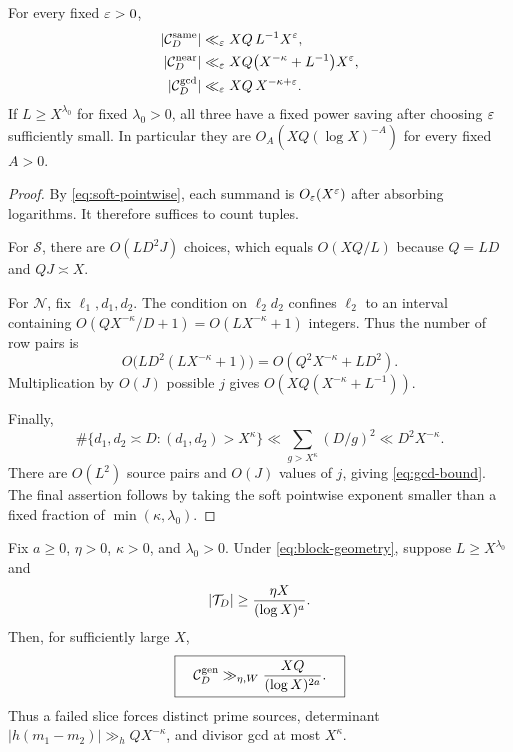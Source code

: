 \begin{theorem}
\label{thm:degenerate-removal}
For every fixed $\varepsilon>0$,
\begin{align}
 |\mathcal C_D^{\mathrm{same}}|
 &\ll_\varepsilon XQ\,L^{-1}X^\varepsilon,
 \label{eq:same-bound}\\
 |\mathcal C_D^{\mathrm{near}}|
 &\ll_\varepsilon XQ\bigl(X^{-\kappa}+L^{-1}\bigr)X^\varepsilon,
 \label{eq:near-bound}\\
 |\mathcal C_D^{\mathrm{gcd}}|
 &\ll_\varepsilon XQ\,X^{-\kappa+\varepsilon}.
 \label{eq:gcd-bound}
\end{align}
If $L\ge X^{\lambda_0}$ for fixed $\lambda_0>0$, all three have a
fixed power saving after choosing $\varepsilon$ sufficiently small.  In
particular they are $O_A(XQ(\log X)^{-A})$ for every fixed $A>0$.
\end{theorem}

\begin{proof}
By \eqref{eq:soft-pointwise}, each summand is $O_\varepsilon(X^\varepsilon)$ after
absorbing logarithms.  It therefore suffices to count tuples.

For $\mathscr S$, there are $O(LD^2J)$ choices, which equals
$O(XQ/L)$ because $Q=LD$ and $QJ\asymp X$.

For $\mathscr N$, fix $\ell_1,d_1,d_2$.  The condition on
$\ell_2d_2$ confines $\ell_2$ to an interval containing
$O(QX^{-\kappa}/D+1)=O(LX^{-\kappa}+1)$ integers.  Thus the number of
row pairs is
\[
 O\bigl(LD^2(LX^{-\kappa}+1)\bigr)
 =O(Q^2X^{-\kappa}+LD^2).
\]
Multiplication by $O(J)$ possible $j$ gives
$O(XQ(X^{-\kappa}+L^{-1}))$.

Finally,
\[
 \#\{d_1,d_2\asymp D:(d_1,d_2)>X^\kappa\}
 \ll\sum_{g>X^\kappa}(D/g)^2
 \ll D^2X^{-\kappa}.
\]
There are $O(L^2)$ source pairs and $O(J)$ values of $j$, giving
\eqref{eq:gcd-bound}.  The final assertion follows by taking the soft
pointwise exponent smaller than a fixed fraction of
$\min(\kappa,\lambda_0)$.
\end{proof}

\begin{theorem}
\label{thm:generic-stopping}
Fix $a\ge0$, $\eta>0$, $\kappa>0$, and $\lambda_0>0$.  Under
\eqref{eq:block-geometry}, suppose $L\ge X^{\lambda_0}$ and
\begin{equation}
 |\mathcal T_D|\ge\frac{\eta X}{(\log X)^a}.
 \label{eq:TD-failure}
\end{equation}
Then, for sufficiently large $X$,
\begin{equation}
 \boxed{\quad
 \mathcal C_D^{\mathrm{gen}}
 \gg_{\eta,W}\frac{XQ}{(\log X)^{2a}}.
 \quad}
 \label{eq:generic-witness}
\end{equation}
Thus a failed slice forces distinct prime sources, determinant
$|h(m_1-m_2)|\gg_h QX^{-\kappa}$, and divisor gcd at most $X^\kappa$.
\end{theorem}

